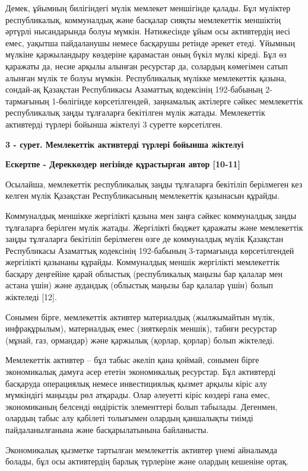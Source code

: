 {Демек, ұйымның билігіндегі мүлік мемлекет меншігінде қалады. Бұл
мүліктер республикалық, коммуналдық және басқалар сияқты мемлекеттік
меншіктің әртүрлі нысандарында болуы мүмкін. Нәтижесінде ұйым осы
активтердің иесі емес, уақытша пайдаланушы немесе басқарушы ретінде
әрекет етеді. Ұйымның мүлкіне қаржыландыру көздеріне қарамастан оның
бүкіл мүлкі кіреді. Бұл өз қаражаты да, несие арқылы алынған ресурстар
да, солардың көмегімен сатып алынған мүлік те болуы мүмкін.
Республикалық мүлікке мемлекеттік қазына, сондай-ақ Қазақстан
Республикасы Азаматтық кодексінің 192-бабының 2-тармағының 1-бөлігінде
көрсетілгендей, заңнамалық актілерге сәйкес мемлекеттік республикалық
заңды тұлғаларға бекітілген мүлік жатады. Мемлекеттік активтерді түрлері
бойынша жіктелуі 3 суретте көрсетілген.

{\bfseries 3 - сурет. Мемлекеттік активтерді түрлері бойынша жіктелуі}

{\bfseries Ескертпе - Дереккөздер негізінде құрастырған автор {[}10-11{]}}

Осылайша, мемлекеттік республикалық заңды тұлғаларға бекітіліп
берілмеген кез келген мүлік Қазақстан Республикасының мемлекеттік
қазынасын құрайды.

Коммуналдық меншікке жергілікті қазына мен заңға сәйкес коммуналдық
заңды тұлғаларға берілген мүлік жатады. Жергілікті бюджет қаражаты және
мемлекеттік заңды тұлғаларға бекітіліп берілмеген өзге де коммуналдық
мүлік Қазақстан Республикасы Азаматтық кодексінің 192-бабының
3-тармағында көрсетілгендей жергілікті қазынаны құрайды. Коммуналдық
меншік жергілікті мемлекеттік басқару деңгейіне қарай облыстық
(республикалық маңызы бар қалалар мен астана үшін) және аудандық
(облыстық маңызы бар қалалар үшін) болып жіктеледі {[}12{]}.

Сонымен бірге, мемлекеттік активтер материалдық (жылжымайтын мүлік,
инфрақұрылым), материалдық емес (зияткерлік меншік), табиғи ресурстар
(мұнай, газ, ормандар) және қаржылық (қорлар, қорлар) болып жіктеледі.

Мемлекеттік активтер -- бұл табыс әкеліп қана қоймай, сонымен бірге
экономикалық дамуға әсер ететін экономикалық ресурстар. Бұл активтерді
басқаруда операциялық немесе инвестициялық қызмет арқылы кіріс алу
мүмкіндігі маңызды рөл атқарады. Олар әлеуетті кіріс көздері ғана емес,
экономиканың белсенді өндірістік элементтері болып табылады. Дегенмен,
олардың табыс алу қабілеті толығымен олардың қаншалықты тиімді
пайдаланылғанына және басқарылатынына байланысты.

Экономикалық қызметке тартылған мемлекеттік активтер үнемі айналымда
болады, бұл осы активтердің барлық түрлеріне және олардың кешеніне
ортақ.

}

